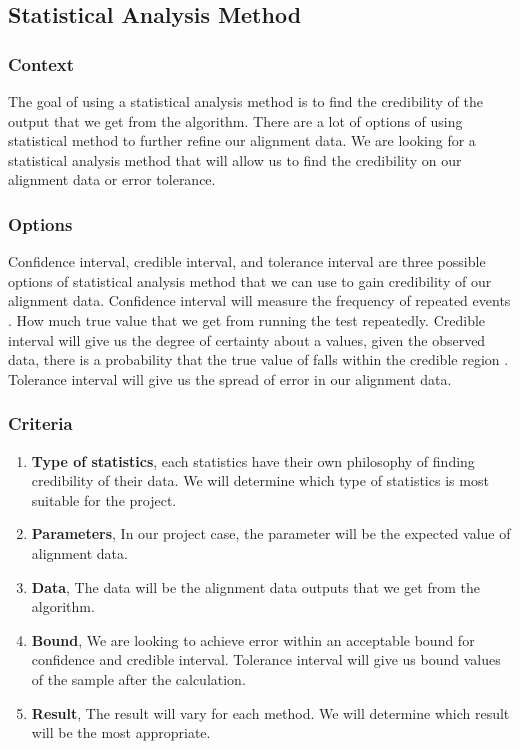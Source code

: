 
\subsection{Statistical Analysis Method}
\subsubsection{Context}
The goal of using a statistical analysis method is to find the credibility of the output that we get from the algorithm. There are a lot of options of using statistical method to further refine our alignment data. We are looking for a statistical analysis method that will allow us to find the credibility on our alignment data or error tolerance. \\

\subsubsection{Options}
Confidence interval, credible interval, and tolerance interval are three possible options of statistical analysis method that we can use to gain credibility of our alignment data. Confidence interval will measure the frequency of repeated events \cite{stat}. How much true value that we get from running the test repeatedly. Credible interval will give us the degree of certainty about a values, given the observed data, there is a probability that the true value of falls within the credible region \cite{stat}. Tolerance interval will give us the spread of error in our alignment data.\\

\subsubsection{Criteria}
\begin{enumerate}
	\item \textbf{Type of statistics}, each statistics have their own philosophy of finding credibility of their data. We will determine which type of statistics is most suitable for the project. 
	\item \textbf{Parameters}, In our project case, the parameter will be the expected value of alignment data. 
	\item \textbf{Data}, The data will be the alignment data outputs that we get from the algorithm.  
	\item \textbf{Bound}, We are looking to achieve error within an acceptable bound for confidence and credible interval. Tolerance interval will give us bound values of the sample after the calculation. 
	\item \textbf{Result}, The result will vary for each method. We will determine which result will be the most appropriate.\\
\end{enumerate}

